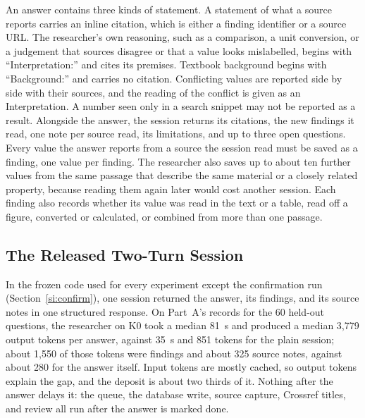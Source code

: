 \documentclass[journal=mamobx,manuscript=suppinfo]{achemso}
\begin{document}
An answer contains three kinds of statement.
A statement of what a source reports carries an inline citation, which is either a finding identifier or a source URL.
The researcher's own reasoning, such as a comparison, a unit conversion, or a judgement that sources disagree or that a value looks mislabelled, begins with ``Interpretation:'' and cites its premises.
Textbook background begins with ``Background:'' and carries no citation.
Conflicting values are reported side by side with their sources, and the reading of the conflict is given as an Interpretation.
A number seen only in a search snippet may not be reported as a result.
Alongside the answer, the session returns its citations, the new findings it read, one note per source read, its limitations, and up to three open questions.
Every value the answer reports from a source the session read must be saved as a finding, one value per finding.
The researcher also saves up to about ten further values from the same passage that describe the same material or a closely related property, because reading them again later would cost another session.
Each finding also records whether its value was read in the text or a table, read off a figure, converted or calculated, or combined from more than one passage.

\subsection{The Released Two-Turn Session}
\label{si:twoturn}

In the frozen code used for every experiment except the confirmation run (Section~\ref{si:confirm}), one session returned the answer, its findings, and its source notes in one structured response.
On Part~A's records for the 60 held-out questions, the researcher on K0 took a median 81~s and produced a median 3,779 output tokens per answer, against 35~s and 851 tokens for the plain session; about 1,550 of those tokens were findings and about 325 source notes, against about 280 for the answer itself.
Input tokens are mostly cached, so output tokens explain the gap, and the deposit is about two thirds of it.
Nothing after the answer delays it: the queue, the database write, source capture, Crossref titles, and review all run after the answer is marked done.
\end{document}
